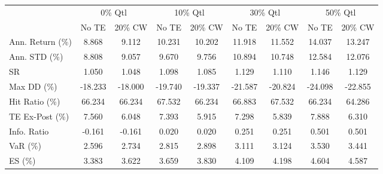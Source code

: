 \begin{tabular}{lcccccccc}
\toprule
{} & \multicolumn{2}{c}{0\% Qtl} & \multicolumn{2}{c}{10\% Qtl} & \multicolumn{2}{c}{30\% Qtl} & \multicolumn{2}{c}{50\% Qtl} \\
{} &   No TE &  20\% CW &   No TE &  20\% CW &   No TE &  20\% CW &   No TE &  20\% CW \\
\midrule
Ann. Return (\%) &   8.868 &   9.112 &  10.231 &  10.202 &  11.918 &  11.552 &  14.037 &  13.247 \\
Ann. STD (\%)    &   8.808 &   9.057 &   9.670 &   9.756 &  10.894 &  10.748 &  12.584 &  12.076 \\
SR              &   1.050 &   1.048 &   1.098 &   1.085 &   1.129 &   1.110 &   1.146 &   1.129 \\
Max DD (\%)      & -18.233 & -18.000 & -19.740 & -19.337 & -21.587 & -20.824 & -24.098 & -22.855 \\
Hit Ratio (\%)   &  66.234 &  66.234 &  67.532 &  66.234 &  66.883 &  67.532 &  66.234 &  64.286 \\
TE Ex-Post (\%)  &   7.560 &   6.048 &   7.393 &   5.915 &   7.298 &   5.839 &   7.888 &   6.310 \\
Info. Ratio     &  -0.161 &  -0.161 &   0.020 &   0.020 &   0.251 &   0.251 &   0.501 &   0.501 \\
VaR (\%)         &   2.596 &   2.734 &   2.815 &   2.898 &   3.111 &   3.124 &   3.530 &   3.441 \\
ES (\%)          &   3.383 &   3.622 &   3.659 &   3.830 &   4.109 &   4.198 &   4.604 &   4.587 \\
\bottomrule
\end{tabular}
